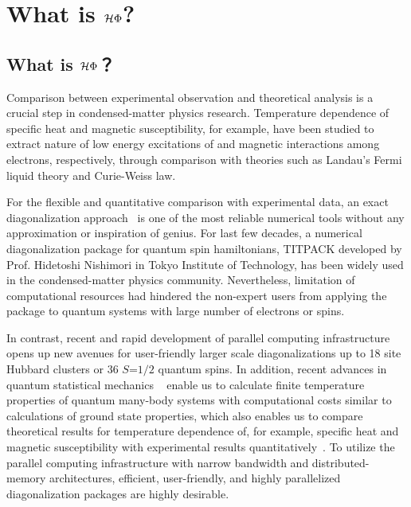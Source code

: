 \chapter{What is ${\mathcal{H} \Phi}$?}
\label{Ch:whatishphi}
\section{What is $\mathcal{H} \Phi$？}
Comparison between experimental observation and theoretical analysis is a crucial step
in condensed-matter physics research. Temperature dependence of specific heat and
magnetic susceptibility, for example, have been studied to extract nature of low energy
excitations of and magnetic interactions among electrons, respectively, through comparison
with theories such as Landau's Fermi liquid theory and Curie-Weiss law.

For the flexible and quantitative comparison with experimental data, an exact diagonalization
approach~\cite{Dagotto} is one of the most reliable numerical tools without any approximation or
inspiration of genius. For last few decades, a numerical diagonalization package for quantum
spin hamiltonians, TITPACK developed by Prof. Hidetoshi Nishimori in Tokyo Institute of Technology,
has been widely used in the condensed-matter physics community. Nevertheless, limitation of
computational resources had hindered the non-expert users from applying the package to
quantum systems with large number of electrons or spins.

In contrast, recent and rapid development of parallel computing infrastructure opens up new
avenues for user-friendly larger scale diagonalizations up to 18 site Hubbard clusters
or 36 $S$=$1/2$ quantum spins. In addition, recent advances in quantum statistical mechanics ~\cite{Imada1986,FTLanczos,Hams,Sugiura2012}
enable us to calculate finite temperature properties of quantum many-body systems
with computational costs similar to calculations of ground state properties,
which also enables us to compare theoretical results for temperature dependence
of, for example, specific heat and magnetic susceptibility with experimental results quantitatively~\cite{Yamaji2014}.
To utilize the parallel computing infrastructure with narrow bandwidth and distributed-memory
architectures, efficient, user-friendly, and highly parallelized diagonalization packages are highly desirable.

